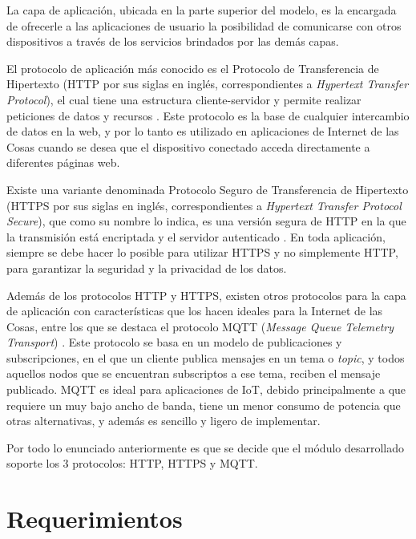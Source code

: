 La capa de aplicación, ubicada en la parte superior del modelo, es la encargada de ofrecerle a las aplicaciones de usuario la posibilidad de comunicarse con otros dispositivos a través de los servicios brindados por las demás capas.

El protocolo de aplicación más conocido es el Protocolo de Transferencia de Hipertexto (HTTP por sus siglas en inglés, correspondientes a \emph{Hypertext Transfer Protocol}), el cual tiene una estructura cliente-servidor y permite realizar peticiones de datos y recursos \citep{http_protocol}. Este protocolo es la base de cualquier intercambio de datos en la web, y por lo tanto es utilizado en aplicaciones de Internet de las Cosas cuando se desea que el dispositivo conectado acceda directamente a diferentes páginas web.

Existe una variante denominada Protocolo Seguro de Transferencia de Hipertexto (HTTPS por sus siglas en inglés, correspondientes a \emph{Hypertext Transfer Protocol Secure}), que como su nombre lo indica, es una versión segura de HTTP en la que la transmisión está encriptada y el servidor autenticado \citep{https_protocol}. En toda aplicación, siempre se debe hacer lo posible para utilizar HTTPS y no simplemente HTTP, para garantizar la seguridad y la privacidad de los datos.

Además de los protocolos HTTP y HTTPS, existen otros protocolos para la capa de aplicación con características que los hacen ideales para la Internet de las Cosas, entre los que se destaca el protocolo MQTT (\emph{Message Queue Telemetry Transport}) \citep{mqtt_protocol}. Este protocolo se basa en un modelo de publicaciones y subscripciones, en el que un cliente publica mensajes en un tema o \emph{topic}, y todos aquellos nodos que se encuentran subscriptos a ese tema, reciben el mensaje publicado. MQTT es ideal para aplicaciones de IoT, debido principalmente a que requiere un muy bajo ancho de banda, tiene un menor consumo de potencia que otras alternativas, y además es sencillo y ligero de implementar.

Por todo lo enunciado anteriormente es que se decide que el módulo desarrollado soporte los 3 protocolos: HTTP, HTTPS y MQTT.

\section{Requerimientos}
\label{requerimientos}

